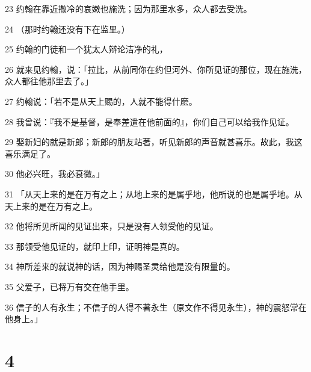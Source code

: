 \par 23 约翰在靠近撒冷的哀嫩也施洗；因为那里水多，众人都去受洗。
\par 24 （那时约翰还没有下在监里。）
\par 25 约翰的门徒和一个犹太人辩论洁净的礼，
\par 26 就来见约翰，说：「拉比，从前同你在约但河外、你所见证的那位，现在施洗，众人都往他那里去了。」
\par 27 约翰说：「若不是从天上赐的，人就不能得什麽。
\par 28 我曾说：『我不是基督，是奉差遣在他前面的』，你们自己可以给我作见证。
\par 29 娶新妇的就是新郎；新郎的朋友站著，听见新郎的声音就甚喜乐。故此，我这喜乐满足了。
\par 30 他必兴旺，我必衰微。」
\par 31 「从天上来的是在万有之上；从地上来的是属乎地，他所说的也是属乎地。从天上来的是在万有之上。
\par 32 他将所见所闻的见证出来，只是没有人领受他的见证。
\par 33 那领受他见证的，就印上印，证明神是真的。
\par 34 神所差来的就说神的话，因为神赐圣灵给他是没有限量的。
\par 35 父爱子，已将万有交在他手里。
\par 36 信子的人有永生；不信子的人得不著永生（原文作不得见永生），神的震怒常在他身上。」

\chapter{4}


